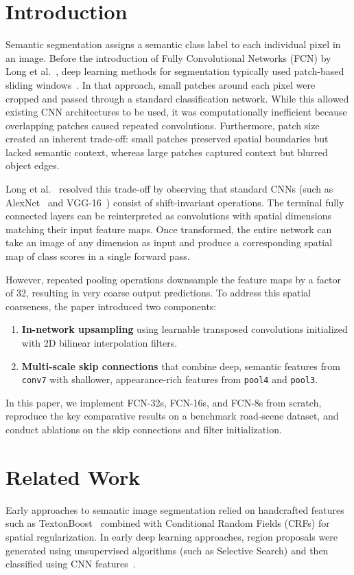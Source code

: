\documentclass[conference]{IEEEtran}
\begin{document}
\section{Introduction}
Semantic segmentation assigns a semantic class label to each individual pixel in an image. Before the introduction of Fully Convolutional Networks (FCN) by Long et al.~\cite{long2015fully}, deep learning methods for segmentation typically used patch-based sliding windows~\cite{ciresan2012deep}. In that approach, small patches around each pixel were cropped and passed through a standard classification network. While this allowed existing CNN architectures to be used, it was computationally inefficient because overlapping patches caused repeated convolutions. Furthermore, patch size created an inherent trade-off: small patches preserved spatial boundaries but lacked semantic context, whereas large patches captured context but blurred object edges.

Long et al.~\cite{long2015fully} resolved this trade-off by observing that standard CNNs (such as AlexNet~\cite{krizhevsky2012imagenet} and VGG-16~\cite{simonyan2014very}) consist of shift-invariant operations. The terminal fully connected layers can be reinterpreted as convolutions with spatial dimensions matching their input feature maps. Once transformed, the entire network can take an image of any dimension as input and produce a corresponding spatial map of class scores in a single forward pass.

However, repeated pooling operations downsample the feature maps by a factor of 32, resulting in very coarse output predictions. To address this spatial coarseness, the paper introduced two components:
\begin{enumerate}
    \item \textbf{In-network upsampling} using learnable transposed convolutions initialized with 2D bilinear interpolation filters.
    \item \textbf{Multi-scale skip connections} that combine deep, semantic features from \texttt{conv7} with shallower, appearance-rich features from \texttt{pool4} and \texttt{pool3}.
\end{enumerate}

In this paper, we implement FCN-32s, FCN-16s, and FCN-8s from scratch, reproduce the key comparative results on a benchmark road-scene dataset, and conduct ablations on the skip connections and filter initialization.

\section{Related Work}
Early approaches to semantic image segmentation relied on handcrafted features such as TextonBoost~\cite{shotton2009textonboost} combined with Conditional Random Fields (CRFs) for spatial regularization. In early deep learning approaches, region proposals were generated using unsupervised algorithms (such as Selective Search) and then classified using CNN features~\cite{girshick2014rich}.
\end{document}
